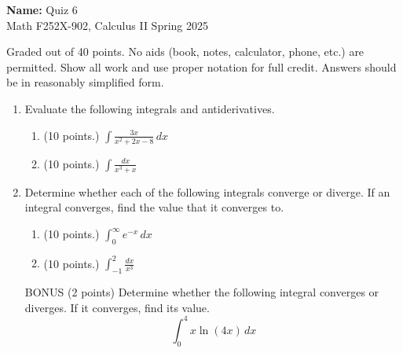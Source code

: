 \documentclass[12pt]{article}
\newcommand{\ds}{\displaystyle}
\newcommand{\points}[1]{(#1 points.)}		%
\begin{document}
\pagestyle{plain}

\noindent \textbf{Name:} \underline{\hspace{15em}}		\hfill	Quiz 6 \\
           Math F252X-902, Calculus II  			\hfill	Spring 2025 	

                \vspace{1cm}
                
Graded out of 40 points. No aids (book, notes,
calculator, phone, etc.) are permitted. Show all work and use proper
notation for full credit. Answers should be in reasonably simplified
form.

\begin{enumerate}

\item Evaluate the following integrals and antiderivatives.
  \begin{enumerate}
    \item \points{10} $\ds \int \frac{3x}{x^2 + 2x - 8} \, dx$
      \vfill

    \item \points{10} $\ds \int \frac{dx}{x^3+x}$
      \vfill

  \end{enumerate}

  \newpage

\item Determine whether each of the following integrals converge or
  diverge. If an integral converges, find the value that it converges
  to.
  \begin{enumerate}
    \item \points{10} $\ds \int_0^{\infty} e^{-x} \, dx$
      \vfill

    \item \points{10} $\ds \int_{-1}^2 \frac{dx}{x^3}$
      \vfill
  \end{enumerate}

  \newpage

  BONUS (2 points) Determine whether the following integral converges
  or diverges. If it converges, find its value.
  $$
  \int_0^4 x\ln(4x) \, dx
  $$
  
\end{enumerate}
\end{document}
